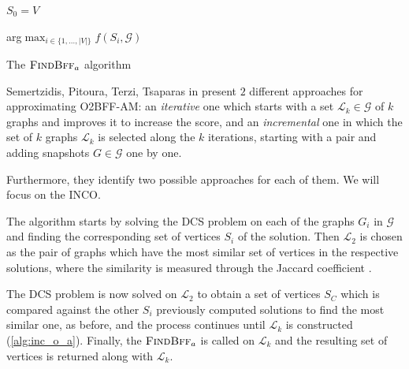 \begin{algorithm}
	\SetAlgoLined
	$S_{0} = V$ \;


	\Return arg$\max _{i \in \{ 1, \dots, |V|\}} f(S_{i}, \mathcal{G})  $
	\caption{The $\textsc{FindBff}_{a} $ algorithm}
	\label{alg:findbff_a}
\end{algorithm}

Semertzidis, Pitoura, Terzi, Tsaparas in \cite{semertzidis2019finding} present
$2$ different approaches for approximating \acrshort{O2BFF}-AM: an \emph{iterative} one
which starts with a set $\mathcal{L} _{k} \in \mathcal{G} $ of $k$ graphs and improves it to
increase the score, and an \emph{incremental} one in which the set of $k$
graphs $\mathcal{L}_{k} $ is selected along the $k$ iterations, starting with a
pair and adding snapshots $G \in \mathcal{G} $ one by one.

Furthermore, they identify two possible approaches for each of them. We will
focus on the \acrfull{INCO}.

The algorithm starts by solving the \acrshort{DCS} problem on each of the
graphs $G_{i} $ in $\mathcal{G} $ and finding the corresponding set of vertices
$S_{i} $ of the solution. Then $\mathcal{L}_{2}  $ is chosen as the pair of graphs which
have the most similar set of vertices in the respective solutions, where the
similarity is measured through the Jaccard coefficient \footnotemark.

The \acrshort{DCS} problem is now solved on $\mathcal{L} _{2} $ to obtain a set
of vertices $S_C$ which is compared against the other $S_i$ previously computed
solutions to
find the most similar one, as before, and the process continues until
$\mathcal{L}_{k} $ is constructed (\autoref{alg:inc_o_a}). Finally, the
$\textsc{FindBff}_{a} $ is called on $\mathcal{L}_{k}  $ and the resulting set of
vertices is returned along with $\mathcal{L}_{k}  $.

